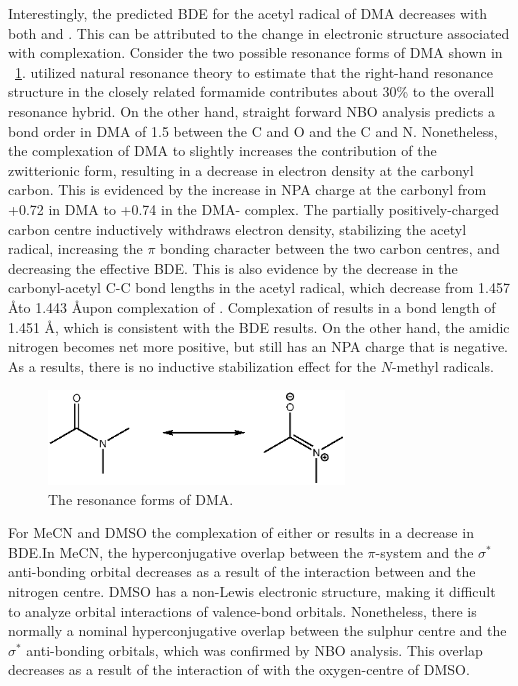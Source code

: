 Interestingly, the predicted BDE for the acetyl radical of DMA decreases with
both  and . This can be attributed to the change in electronic
structure associated with complexation. Consider the two possible resonance
forms of DMA shown in ~\ref{fig:dma-res}. \cite{Hrabal1997} utilized natural
resonance theory to estimate that the right-hand resonance structure in the
closely related formamide contributes about 30\% to the overall resonance
hybrid. On the other hand, straight forward NBO analysis predicts a bond order
in DMA of 1.5 between the C and O and the C and N. Nonetheless, the complexation
of DMA to  slightly increases the contribution of the zwitterionic
form, resulting in a decrease in electron density at the carbonyl carbon. This
is evidenced by the increase in NPA charge at the carbonyl from +0.72 in DMA to
+0.74 in the DMA- complex.  The partially positively-charged carbon
centre inductively withdraws electron density, stabilizing the acetyl radical,
increasing the $\pi$ bonding character between the two carbon centres, and
decreasing the effective BDE. This is also evidence by the decrease in the
carbonyl-acetyl C-C bond lengths in the acetyl radical, which decrease from
1.457 \AA to 1.443 \AA upon complexation of . Complexation of
 results in a bond length of 1.451 \AA, which is consistent with the
BDE results.  On the other hand, the amidic nitrogen becomes net more positive,
but still has an NPA charge that is negative. As a results, there is no
inductive stabilization effect for the $N$-methyl radicals.

\begin{figure}[!htpb]
  \centering
  \includegraphics[width=0.7\textwidth]{figures/DMA-resonance.eps}
  \caption{The resonance forms of DMA.}
  \label{fig:dma-res}
\end{figure}

For MeCN and DMSO the complexation of either  or  results in a
decrease in  BDE.\@ In MeCN, the hyperconjugative overlap between the
 $\pi$-system and the  $\sigma^*$ anti-bonding orbital decreases
as a result of the interaction between  and the nitrogen centre. DMSO
has a non-Lewis electronic structure, making it difficult to analyze orbital
interactions of valence-bond orbitals. Nonetheless, there is normally a nominal
hyperconjugative overlap between the sulphur centre and the  $\sigma^*$
anti-bonding orbitals, which was confirmed by NBO analysis. This overlap
decreases as a result of the interaction of  with the oxygen-centre of
DMSO.

